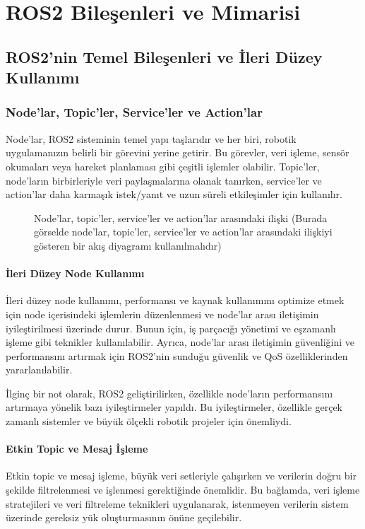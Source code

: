 \chapter{ROS2 Bileşenleri ve Mimarisi}

\section{ROS2'nin Temel Bileşenleri ve İleri Düzey Kullanımı}
\subsection{Node'lar, Topic'ler, Service'ler ve Action'lar}
Node'lar, ROS2 sisteminin temel yapı taşlarıdır ve her biri, robotik uygulamanızın belirli bir görevini yerine getirir. Bu görevler, veri işleme, sensör okumaları veya hareket planlaması gibi çeşitli işlemler olabilir. Topic'ler, node'ların birbirleriyle veri paylaşmalarına olanak tanırken, service'ler ve action'lar daha karmaşık istek/yanıt ve uzun süreli etkileşimler için kullanılır.

\begin{figure}[h]
\centering
\caption{Node'lar, topic'ler, service'ler ve action'lar arasındaki ilişki (Burada görselde node'lar, topic'ler, service'ler ve action'lar arasındaki ilişkiyi gösteren bir akış diyagramı kullanılmalıdır)}
\end{figure}

\subsubsection{İleri Düzey Node Kullanımı}
İleri düzey node kullanımı, performansı ve kaynak kullanımını optimize etmek için node içerisindeki işlemlerin düzenlenmesi ve node'lar arası iletişimin iyileştirilmesi üzerinde durur. Bunun için, iş parçacığı yönetimi ve eşzamanlı işleme gibi teknikler kullanılabilir. Ayrıca, node'lar arası iletişimin güvenliğini ve performansını artırmak için ROS2'nin sunduğu güvenlik ve QoS özelliklerinden yararlanılabilir.

İlginç bir not olarak, ROS2 geliştirilirken, özellikle node'ların performansını artırmaya yönelik bazı iyileştirmeler yapıldı. Bu iyileştirmeler, özellikle gerçek zamanlı sistemler ve büyük ölçekli robotik projeler için önemliydi.

\subsubsection{Etkin Topic ve Mesaj İşleme}
Etkin topic ve mesaj işleme, büyük veri setleriyle çalışırken ve verilerin doğru bir şekilde filtrelenmesi ve işlenmesi gerektiğinde önemlidir. Bu bağlamda, veri işleme stratejileri ve veri filtreleme teknikleri uygulanarak, istenmeyen verilerin sistem üzerinde gereksiz yük oluşturmasının önüne geçilebilir.

